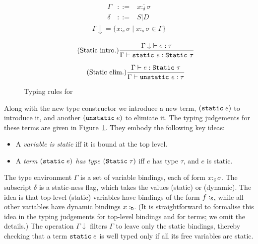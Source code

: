 \documentclass[preprint]{sigplanconf}
\begin{document}
\begin{figure}
\begin{minipage}{\linewidth}
$$
\begin{array}{rcl}
\Gamma & ::= & \overline{x :_{\delta} \sigma} \\
     \delta & ::= & S | D
\end{array}
$$
\begin{align*}
\Gamma\downarrow = \{ x:_{s} \sigma \mid x :_{s} \sigma \in \Gamma \}
\end{align*}

\begin{equation*}
\tag{Static~intro.}
\frac{\Gamma\downarrow~\vdash e : \tau}
     {\Gamma \vdash \text{\tt static}~e : \text{\tt Static}~\tau}
\end{equation*}

\begin{equation*}
\tag{Static~elim.}
\frac{\Gamma \vdash e : \text{\tt Static}~\tau}
     {\Gamma \vdash \text{\tt unstatic}~e : \tau}
\end{equation*}
\end{minipage}
\caption{Typing rules for } \label{fig:static}
\end{figure}
Along with the new type constructor we introduce a new term,
$(\text{\tt static}\;e)$ to introduce it, and another 
$(\text{\tt unstatic}\;e)$ to elimiate it.
The typing judgements for these terms are given in Figure~\ref{fig:static}.
They embody the following key ideas:
\begin{itemize}
\item A \emph{variable is static} iff it is bound at the top level.
\item A \emph{term $(\text{\tt static}\;e)$ has type $(\text{\tt Static}\;\tau)$} iff 
$e$ has type $\tau$, and $e$ is static.  
\end{itemize}
The type environment $\Gamma$ is a set of variable bindings, each of form $x :_{\delta} \sigma$.
The subscript $\delta$ is a static-ness flag, which takes the values  (static) or
 (dynamic).  The idea is that top-level (static) variables have bindings
of the form $f :_{\text{\tt S}}$, while all other variables have dynamic bindings $x :_{\text{\tt D}}$.
(It is straightforward to formalise this idea in the typing judgements for top-level
bindings and for terms; we omit the details.)
The operation $\Gamma \downarrow$ filters $\Gamma$ to leave only the static bindings,
thereby checking that a term $\text{\tt static}\;e$ is well typed only if all its free
variables are static.
\end{document}
